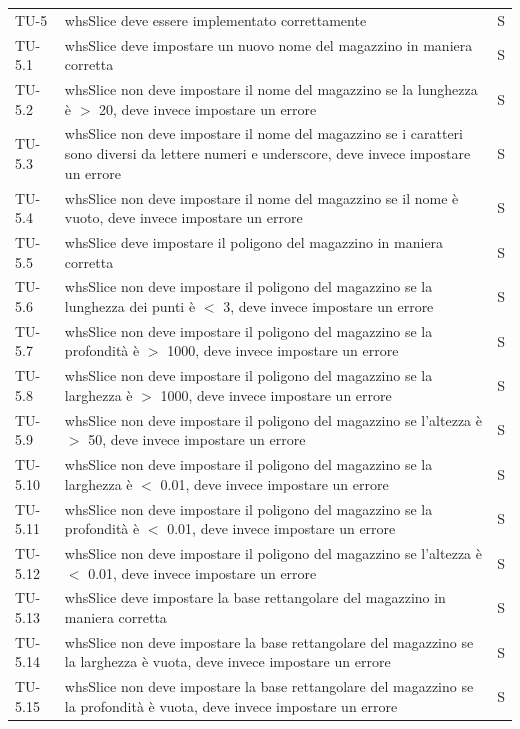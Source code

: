 \begin{xltabular}{0.9\textwidth}{X | p{0.6\textwidth} | p{0.1\textwidth} }
    TU-5 & whsSlice deve essere implementato correttamente & S\\
    TU-5.1 & whsSlice deve impostare un nuovo nome del magazzino in maniera corretta & S\\
    TU-5.2 & whsSlice non deve impostare il nome del magazzino se la lunghezza è $>$ 20, deve invece impostare un errore & S\\
    TU-5.3 & whsSlice non deve impostare il nome del magazzino se i caratteri sono diversi da lettere numeri e underscore, deve invece impostare un errore & S\\
    TU-5.4 & whsSlice non deve impostare il nome del magazzino se il nome è vuoto, deve invece impostare un errore & S\\
    TU-5.5 & whsSlice deve impostare il poligono del magazzino in maniera corretta & S\\
    TU-5.6 & whsSlice non deve impostare il poligono del magazzino se la lunghezza dei punti è $<$ 3, deve invece impostare un errore & S\\
    TU-5.7 & whsSlice non deve impostare il poligono del magazzino se la profondità è $>$ 1000, deve invece impostare un errore & S\\
    TU-5.8 & whsSlice non deve impostare il poligono del magazzino se la larghezza è $>$ 1000, deve invece impostare un errore & S\\
    TU-5.9 & whsSlice non deve impostare il poligono del magazzino se l'altezza è $>$ 50, deve invece impostare un errore & S\\
    TU-5.10 & whsSlice non deve impostare il poligono del magazzino se la larghezza è $<$ 0.01, deve invece impostare un errore & S\\
    TU-5.11 & whsSlice non deve impostare il poligono del magazzino se la profondità è $<$ 0.01, deve invece impostare un errore & S\\
    TU-5.12 & whsSlice non deve impostare il poligono del magazzino se l'altezza è $<$ 0.01, deve invece impostare un errore & S\\
    TU-5.13 & whsSlice deve impostare la base rettangolare del magazzino in maniera corretta & S\\
    TU-5.14 & whsSlice non deve impostare la base rettangolare del magazzino se la larghezza è vuota, deve invece impostare un errore & S\\
    TU-5.15 & whsSlice non deve impostare la base rettangolare del magazzino se la profondità è vuota, deve invece impostare un errore & S\\

\end{xltabular}
